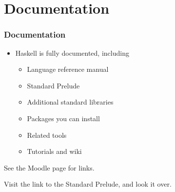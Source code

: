\documentclass{beamer}
\begin{document}
\section{Documentation}

\begin{frame}[fragile]
\frametitle{Documentation}

\begin{itemize}
\item Haskell is fully documented, including
  \begin{itemize}
  \item Language reference manual
  \item Standard Prelude
  \item Additional standard libraries
  \item Packages you can install
  \item Related tools
  \item Tutorials and wiki
  \end{itemize}
\end{itemize}

See the Moodle page for links.

{\redtext Visit the link to the Standard Prelude, and look it over.}

\end{frame}
\end{document}
